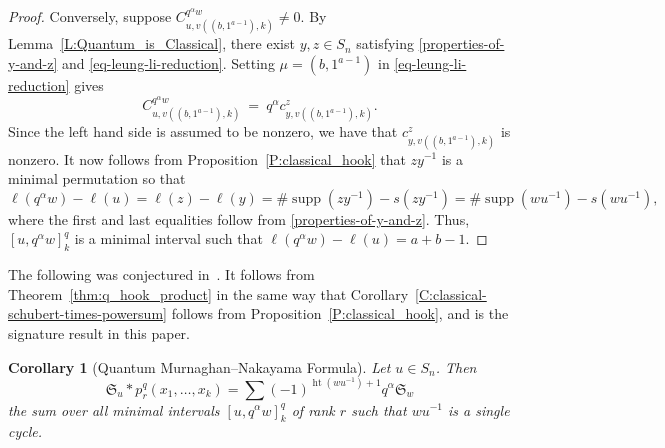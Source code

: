 \documentclass[11pt]{article}
\newtheorem{corollary}[theo]{Corollary}
\theoremstyle{definition}
\numberwithin{equation}{section}
\newcommand{\frakS}{{\mathfrak S}}
\DeclareMathOperator{\het}{ht}
\DeclareMathOperator{\supp}{supp}
\begin{document}
\begin{proof}
    Conversely,
    suppose $C^{q^\alpha w}_{u,v((b, 1^{a-1}), k)} \neq 0$.
    By Lemma~\ref{L:Quantum_is_Classical},
    there exist $y, z \in S_n$ satisfying
    \eqref{properties-of-y-and-z} and \eqref{eq-leung-li-reduction}.
    Setting $\mu = (b, 1^{a-1})$ in \eqref{eq-leung-li-reduction} gives
    \begin{equation}
        C^{q^\alpha w}_{u,v((b, 1^{a-1}),k)}
        \ =\ q^\alpha c^z_{y,v((b, 1^{a-1}),k)}.
    \end{equation}
    Since the left hand side is assumed to be nonzero, we have that
    $c^z_{y,v((b, 1^{a-1}),k)}$ is nonzero.
    It now follows from Proposition~\ref{P:classical_hook} that
    $z y^{-1}$ is a minimal permutation so that
    \begin{equation*}
        \ell(q^\alpha w) - \ell(u)
        = \ell(z) - \ell(y)
        = \#\supp(z y^{-1}) - s(z y^{-1})
        = \#\supp(w u^{-1}) - s(w u^{-1}),
    \end{equation*}
    where the first and last equalities follow from \eqref{properties-of-y-and-z}.
    Thus, $[u, q^\alpha w]_k^q$ is a minimal interval such that
    $\ell(q^\alpha w) - \ell(u) = a{+}b{-}1$.
\end{proof}

The following was conjectured in~\cite{Morrison}.
It follows from Theorem~\ref{thm:q_hook_product} in the same way that
Corollary~\ref{C:classical-schubert-times-powersum} follows from Proposition~\ref{P:classical_hook},
and is the signature result in this paper.

\begin{corollary}[Quantum Murnaghan--Nakayama Formula]
    \label{C:quantumMN}
    Let $u \in S_n$. Then
    \begin{equation*}
        \frakS_u \ast p_r^q(x_1,\dotsc,x_k) = \sum (-1)^{\het(wu^{-1})+1} q^\alpha \frakS_{w}
    \end{equation*}
    the sum over all minimal intervals $[u, q^{\alpha}w]_k^q$ of rank $r$ such that $wu^{-1}$ is a
    single cycle.
\end{corollary}
\end{document}
